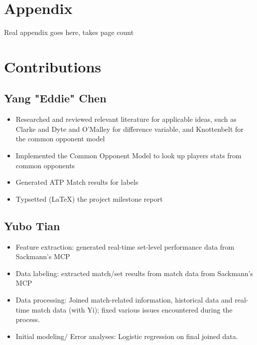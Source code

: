 \documentclass[paper=a4, fontsize=11pt]{scrartcl} %
\numberwithin{equation}{section} %
\numberwithin{figure}{section} %
\numberwithin{table}{section} %
\begin{document}
\section{Appendix}
Real appendix goes here, takes page count

\section{Contributions}
\subsection{Yang "Eddie" Chen}
\begin{itemize}
\item Researched and reviewed relevant literature for applicable ideas, such as Clarke and Dyte \cite{Clarke2010} and O'Malley \cite{omalley} for difference variable, and Knottenbelt \cite{KNOTTENBELT20123820} for the common opponent model
\item Implemented the Common Opponent Model to look up players stats from common opponents
\item Generated ATP Match results for labels
\item Typsetted (\LaTeX) the project milestone report
\end{itemize}

\subsection{Yubo Tian}
\begin{itemize}
\item Feature extraction:  generated real-time set-level performance data from Sackmann's MCP
\cite{tennis_charting}
\item Data labeling: extracted match/set results from match data from Sackmann's MCP 
\cite{tennis_charting}
\item Data processing: Joined match-related information, historical data and real-time match data (with Yi); fixed various issues encountered during the process.
\item Initial modeling/ Error analyses: Logistic regression on final joined data.
\end{itemize}
\end{document}

